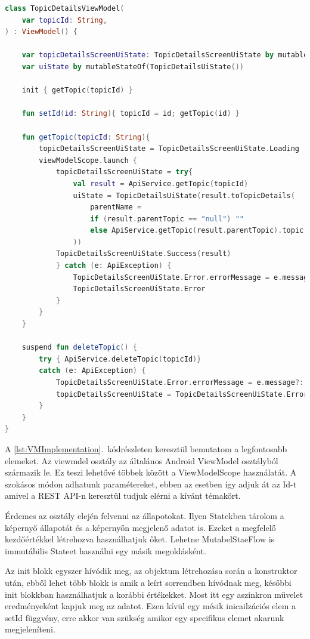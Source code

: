 \begin{lstlisting}[caption={ViewModel implementációja.}, label={lst:VMImplementation}, language=Kotlin]
class TopicDetailsViewModel(
    var topicId: String,
) : ViewModel() {

    var topicDetailsScreenUiState: TopicDetailsScreenUiState by mutableStateOf(TopicDetailsScreenUiState.Loading)
    var uiState by mutableStateOf(TopicDetailsUiState())
    
    init { getTopic(topicId) }

    fun setId(id: String){ topicId = id; getTopic(id) }

    fun getTopic(topicId: String){
        topicDetailsScreenUiState = TopicDetailsScreenUiState.Loading
        viewModelScope.launch {
            topicDetailsScreenUiState = try{
                val result = ApiService.getTopic(topicId)
                uiState = TopicDetailsUiState(result.toTopicDetails(
                    parentName =
                    if (result.parentTopic == "null") ""
                    else ApiService.getTopic(result.parentTopic).topic
                ))
            TopicDetailsScreenUiState.Success(result)
            } catch (e: ApiException) {
                TopicDetailsScreenUiState.Error.errorMessage = e.message?: "Unkown error"
                TopicDetailsScreenUiState.Error
            }
        }
    }

    suspend fun deleteTopic() {
        try { ApiService.deleteTopic(topicId)} 
        catch (e: ApiException) {
            TopicDetailsScreenUiState.Error.errorMessage = e.message?: "Unkown error"
            topicDetailsScreenUiState = TopicDetailsScreenUiState.Error
        }
    }
}
\end{lstlisting}

A \ref{lst:VMImplementation}.~kódrészleten keresztül bemutatom a legfontosabb elemeket.
Az viewmdel osztály az általános Android ViewModel osztályból származik le.
Ez teszi lehetővé többek között a ViewModelScope használatát.
A szokásos módon adhatunk paramétereket, ebben az esetben így adjuk át az Id-t amivel a REST API-n keresztül tudjuk elérni a kívánt témakört.

Érdemes az osztály elején felvenni az állapotokat.
Ilyen Statekben tárolom a képernyő állapotát és a képernyőn megjelenő adatot is.
Ezeket a megfelelő kezdőértékkel létrehozva használhatjuk őket.
Lehetne MutabelStaeFlow is immutábilis Stateet használni egy másik megoldásként.

Az init{} blokk egyszer hívódik meg, az objektum létrehozása során a konstruktor után, ebből lehet több blokk is amik a leírt sorrendben hívódnak meg, későbbi init blokkban használhatjuk a korábbi értékekket.
Most itt egy aszinkron művelet eredményeként kapjuk meg az adatot.
Ezen kívül egy mésik inicailzációs elem a setId függvény, erre akkor van szükség amikor egy specifikus elemet akarunk megjeleníteni.

